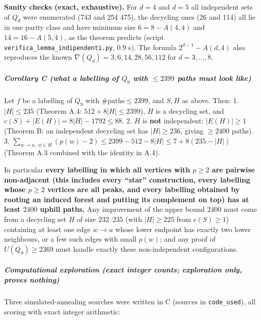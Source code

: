 \documentclass[11pt,a4paper]{article}
\begin{document}
\textbf{Sanity checks (exact, exhaustive).} For \(d=4\) and \(d=5\) all
independent sets of \(Q_d\) were enumerated (743 and 254 475), the
decycling ones (26 and 114) all lie in one parity class and have minimum
size \(6=8-A(4,4)\) and \(14=16-A(5,4)\), as the theorem predicts
(script \texttt{verifica\_lemma\_indipendenti.py}, 0.9 s). The formula
\(2^{d-1}-A(d,4)\) also reproduces the known
\(\nabla(Q_d)=3,6,14,28,56,112\) for \(d=3,\dots,8\).

\subparagraph{\texorpdfstring{Corollary C (what a labelling of \(Q_9\)
with \(\le2399\) paths must look
like)}{Corollary C (what a labelling of Q\_9 with \textbackslash le2399 paths must look like)}}\label{corollary-c-what-a-labelling-of-q_9-with-le2399-paths-must-look-like}

Let \(f\) be a labelling of \(Q_9\) with \(\#\text{paths}\le2399\), and
\(S,H\) as above. Then: 1. \(|H|\le235\) (Theorem A.4:
\(512+8|H|\le2399\)), \(H\) is a decycling set, and
\(c(S)+|E(H)|=8|H|-1792\le88\). 2. \(H\) is \textbf{not} independent:
\(|E(H)|\ge1\) (Theorem B: an independent decycling set has
\(|H|\ge236\), giving \(\ge2400\) paths). 3.
\(\sum_{w\to u,\ w\in H}(p(w)-2)\le2399-512-8|H|\le7+8(235-|H|)\)
(Theorem A.3 combined with the identity in A.4).

In particular \textbf{every labelling in which all vertices with
\(p\ge2\) are pairwise non-adjacent (this includes every ``star''
construction, every labelling whose \(p\ge2\) vertices are all peaks,
and every labelling obtained by rooting an induced forest and putting
its complement on top) has at least \(2400\) uphill paths.} Any
improvement of the upper bound \(2400\) must come from a decycling set
\(H\) of size \(232\)--\(235\) (with \(|H|\ge225\) from \(c(S)\ge1\))
containing at least one edge \(w\to u\) whose lower endpoint has exactly
two lower neighbours, or a few such edges with small \(p(w)\); and any
proof of \(U(Q_9)\ge2369\) must handle exactly these non-independent
configurations.

\subparagraph{Computational exploration (exact integer counts;
exploration only, proves
nothing)}\label{computational-exploration-exact-integer-counts-exploration-only-proves-nothing}

Three simulated-annealing searches were written in C (sources in
\texttt{code\_used}), all scoring with exact integer arithmetic:
\end{document}
